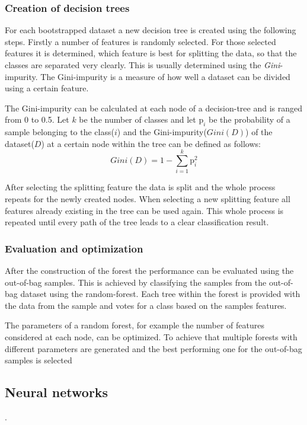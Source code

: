 \subsubsection*{Creation of decision trees}
For each bootstrapped dataset a new decision tree is created using the following steps. Firstly a number of features is randomly selected.
For those selected features it is determined, which feature is best for splitting the data, so that the classes are separated very clearly.
This is usually determined using the \textit{Gini}-impurity.
The Gini-impurity is a measure of how well a dataset can be divided using a certain feature.

The Gini-impurity can be calculated at each node of a decision-tree and is ranged from 0 to 0.5.
Let $k$ be the number of classes and let $\mathrm{p}_{i}$ be the probability of a sample belonging to the class($i$) and the Gini-impurity($Gini(D)$) of the dataset($D$)
at a certain node within the tree can be defined as follows:
\begin{equation*}
    Gini(D) = 1 - \sum_{i=1}^{k} \mathrm{p}_{i}^2
\end{equation*} \cite[]{Karabiber}

After selecting the splitting feature the data is split and the whole process repeats for the newly created nodes.
When selecting a new splitting feature all features already existing in the tree can be used again. This whole process is 
repeated until every path of the tree leads to a clear classification result\cite[]{Breiman2001}.

\subsubsection*{Evaluation and optimization}
After the construction of the forest the performance can be evaluated using the out-of-bag samples.
This is achieved by classifying the samples from the out-of-bag dataset using the random-forest. Each tree within the forest is provided with the data from the sample
and votes for a class based on the samples features.

The parameters of a random forest, for example the number of features considered at each node, can be optimized. To achieve that multiple forests with 
different parameters are generated and the best performing one for the out-of-bag samples is selected\subsection{Neural networks}.
\label{cha:nn}